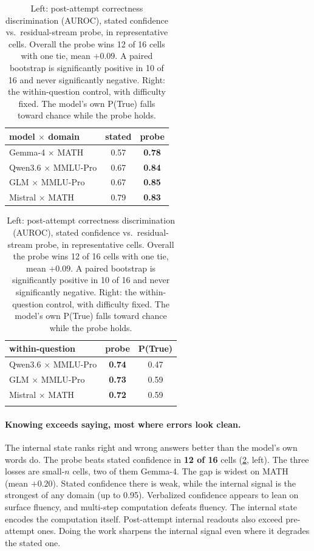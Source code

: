 \documentclass{article}
\begin{document}
\begin{table}[t]
\caption{Left: post-attempt correctness discrimination (AUROC), stated confidence vs.\ residual-stream probe, in representative cells. Overall the probe wins 12 of 16 cells with one tie, mean $+0.09$. A paired bootstrap is significantly positive in 10 of 16 and never significantly negative. Right: the within-question control, with difficulty fixed. The model's own P(True) falls toward chance while the probe holds.}
\label{tab:knowing}
\centering
\small
\begin{tabular}{lcc}
\toprule
\textbf{model $\times$ domain} & \textbf{stated} & \textbf{probe} \\
\midrule
Gemma-4 $\times$ MATH & 0.57 & \textbf{0.78} \\
Qwen3.6 $\times$ MMLU-Pro & 0.67 & \textbf{0.84} \\
GLM $\times$ MMLU-Pro & 0.67 & \textbf{0.85} \\
Mistral $\times$ MATH & 0.79 & \textbf{0.83} \\
\bottomrule
\end{tabular}
\hspace{1.5em}
\begin{tabular}{lcc}
\toprule
\textbf{within-question} & \textbf{probe} & \textbf{P(True)} \\
\midrule
Qwen3.6 $\times$ MMLU-Pro & \textbf{0.74} & 0.47 \\
GLM $\times$ MMLU-Pro & \textbf{0.73} & 0.59 \\
Mistral $\times$ MATH & \textbf{0.72} & 0.59 \\
\\[-0.85em]
\bottomrule
\end{tabular}
\end{table}

\paragraph{Knowing exceeds saying, most where errors look clean.}
The internal state ranks right and wrong answers better than the model's own words do.
The probe beats stated confidence in \textbf{12 of 16} cells (\cref{tab:knowing}, left).
The three losses are small-$n$ cells, two of them Gemma-4.
The gap is widest on MATH (mean $+0.20$).
Stated confidence there is weak, while the internal signal is the strongest of any domain (up to 0.95).
Verbalized confidence appears to lean on surface fluency, and multi-step computation defeats fluency.
The internal state encodes the computation itself.
Post-attempt internal readouts also exceed pre-attempt ones.
Doing the work sharpens the internal signal even where it degrades the stated one.
\end{document}
